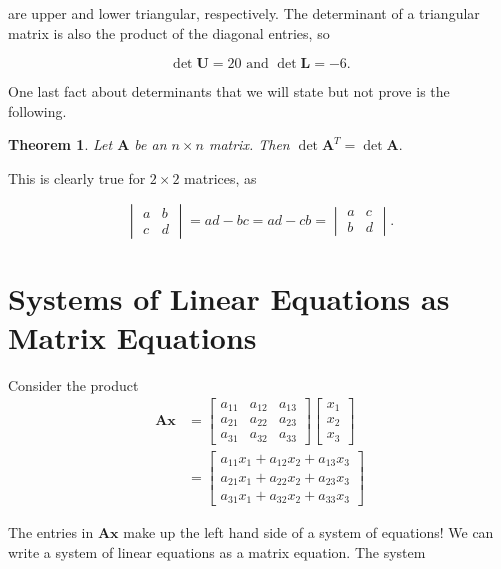 \documentclass[
]{book}
\newtheorem{theorem}{Theorem}[chapter]
\theoremstyle{definition}
\theoremstyle{definition}
\theoremstyle{definition}
\theoremstyle{definition}
\theoremstyle{remark}
\begin{document}
are upper and lower triangular, respectively. The determinant of a triangular matrix is also the product of the diagonal entries, so

\[\det\mathbf{U}=20 \text{ and } \det\mathbf{L}=-6.\]

One last fact about determinants that we will state but not prove is the following.

\begin{theorembox}

\begin{theorem}
Let \(\mathbf{A}\) be an \(n\times n\) matrix. Then \(\det \mathbf{A}^T=\det\mathbf{A}.\)
\end{theorem}

\end{theorembox}

This is clearly true for \(2\times 2\) matrices, as

\[\begin{vmatrix}a & b\\c& d\end{vmatrix}=ad-bc=ad-cb=\begin{vmatrix}a & c\\b& d\end{vmatrix}.\]

\section{Systems of Linear Equations as Matrix Equations}\label{systems-of-linear-equations-as-matrix-equations}

Consider the product
\begin{align*}
\mathbf{A}\mathbf{x}&=\begin{bmatrix}
a_{11}&a_{12}&a_{13}\\a_{21}&a_{22}&a_{23}\\a_{31}&a_{32}&a_{33}
\end{bmatrix}\begin{bmatrix}x_1\\x_2\\x_3\end{bmatrix}\\
&=
\begin{bmatrix}
a_{11}x_1+a_{12}x_2+a_{13}x_3\\
a_{21}x_1+a_{22}x_2+a_{23}x_3\\
a_{31}x_1+a_{32}x_2+a_{33}x_3
\end{bmatrix}
\end{align*}

The entries in \(\mathbf{A}\mathbf{x}\) make up the left hand side of a system of equations! We can write a system of linear equations as a matrix equation. The system
\end{document}
